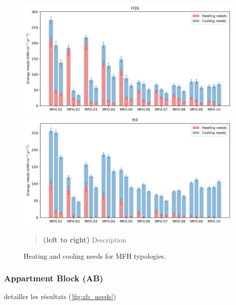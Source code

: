 \documentclass[11pt]{article}
\begin{document}
        \begin{figure}[ht]
            \centering
            \includegraphics[width=0.49\columnwidth]{figures/typology_energy_needs_MFH_H1b_2000-2020.png}
            \includegraphics[width=0.49\columnwidth]{figures/typology_energy_needs_MFH_H3_2000-2020.png}
            \caption{\label{fig:mfh_needs} Heating and cooling needs for MFH typologies.}
            \begin{quote}
                \vspace{-2mm}
                \small\noindent
                \textbf{(left to right)} Description
            \end{quote}
        \end{figure}


        \subsubsection{Appartment Block (AB)} %
        \label{ssub:ab}

        detailler les résultats (\ref{fig:ab_needs})
        
\end{document}
